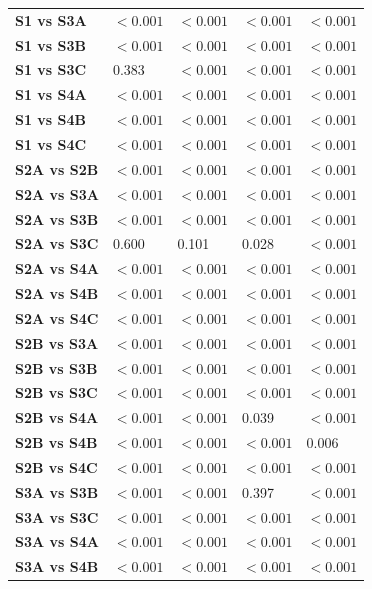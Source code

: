 \begin{table}[H]
{\begin{tabular}{lllll}
        \textbf{S1 vs S3A} & $< 0.001$ & $< 0.001$ & $< 0.001$ & $< 0.001$ \\
        \textbf{S1 vs S3B} & $< 0.001$ & $< 0.001$ & $< 0.001$ & $< 0.001$ \\
        \textbf{S1 vs S3C} & 0.383 & $< 0.001$ & $< 0.001$ & $< 0.001$ \\
        \textbf{S1 vs S4A} & $< 0.001$ & $< 0.001$ & $< 0.001$ & $< 0.001$ \\
        \textbf{S1 vs S4B} & $< 0.001$ & $< 0.001$ & $< 0.001$ & $< 0.001$ \\
        \textbf{S1 vs S4C} & $< 0.001$ & $< 0.001$ & $< 0.001$ & $< 0.001$ \\
        \textbf{S2A vs S2B} & $< 0.001$ & $< 0.001$ & $< 0.001$ & $< 0.001$ \\
        \textbf{S2A vs S3A} & $< 0.001$ & $< 0.001$ & $< 0.001$ & $< 0.001$ \\
        \textbf{S2A vs S3B} & $< 0.001$ & $< 0.001$ & $< 0.001$ & $< 0.001$ \\
        \textbf{S2A vs S3C} & 0.600 & 0.101 & 0.028 & $< 0.001$ \\
        \textbf{S2A vs S4A} & $< 0.001$ & $< 0.001$ & $< 0.001$ & $< 0.001$ \\
        \textbf{S2A vs S4B} & $< 0.001$ & $< 0.001$ & $< 0.001$ & $< 0.001$ \\
        \textbf{S2A vs S4C} & $< 0.001$ & $< 0.001$ & $< 0.001$ & $< 0.001$ \\
        \textbf{S2B vs S3A} & $< 0.001$ & $< 0.001$ & $< 0.001$ & $< 0.001$ \\
        \textbf{S2B vs S3B} & $< 0.001$ & $< 0.001$ & $< 0.001$ & $< 0.001$ \\
        \textbf{S2B vs S3C} & $< 0.001$ & $< 0.001$ & $< 0.001$ & $< 0.001$ \\
        \textbf{S2B vs S4A} & $< 0.001$ & $< 0.001$ & 0.039 & $< 0.001$ \\
        \textbf{S2B vs S4B} & $< 0.001$ & $< 0.001$ & $< 0.001$ & 0.006 \\
        \textbf{S2B vs S4C} & $< 0.001$ & $< 0.001$ & $< 0.001$ & $< 0.001$ \\
        \textbf{S3A vs S3B} & $< 0.001$ & $< 0.001$ & 0.397 & $< 0.001$ \\
        \textbf{S3A vs S3C} & $< 0.001$ & $< 0.001$ & $< 0.001$ & $< 0.001$ \\
        \textbf{S3A vs S4A} & $< 0.001$ & $< 0.001$ & $< 0.001$ & $< 0.001$ \\
        \textbf{S3A vs S4B} & $< 0.001$ & $< 0.001$ & $< 0.001$ & $< 0.001$ \\

\end{tabular}}
\end{table}
